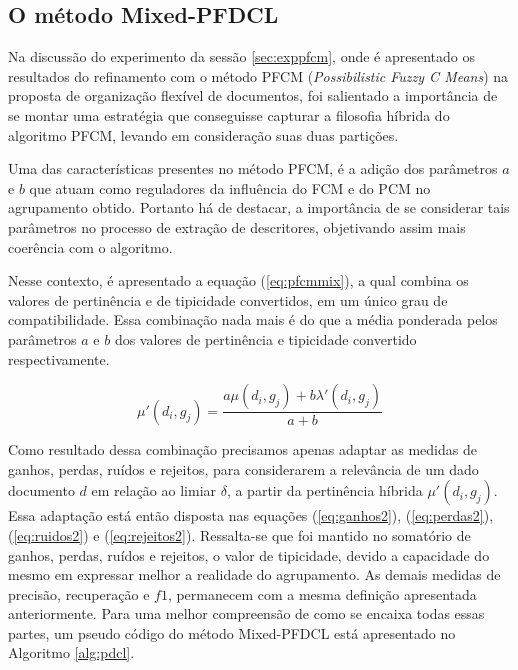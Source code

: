 \subsection{O método Mixed-PFDCL}

Na discussão do experimento da sessão \ref{sec:exppfcm}, onde é apresentado os resultados do
refinamento com o método PFCM ({\it Possibilistic Fuzzy C Means\/}) na proposta de organização
flexível de documentos, foi salientado a importância de se montar uma estratégia que conseguisse
capturar a filosofia híbrida do algoritmo PFCM, levando em consideração suas duas partições. 

Uma das características presentes no método PFCM, é a adição dos parâmetros $a$ e $b$ que atuam como
reguladores da influência do FCM e do PCM no agrupamento obtido. Portanto há de destacar, a
importância de se considerar tais parâmetros no processo de extração de descritores, objetivando
assim mais coerência com o algoritmo.

Nesse contexto, é apresentado a equação (\ref{eq:pfcmmix}), a qual combina os valores de pertinência
e de tipicidade convertidos, em um único grau de compatibilidade. Essa combinação nada mais é do que
a média ponderada pelos parâmetros $a$ e $b$ dos valores de pertinência e tipicidade convertido
respectivamente.

\begin{equation}
  \mu'(d_i,g_j) = \frac{a \mu(d_i,g_j) + b \lambda'(d_i,g_j)}{a+b}
  \label{eq:pfcmmix}
\end{equation}

Como resultado dessa combinação precisamos apenas adaptar as medidas de ganhos, perdas, ruídos e
rejeitos, para considerarem a relevância de um dado documento $d$ em relação ao limiar $\delta$, a
partir da pertinência híbrida $\mu'(d_i,g_j)$. Essa adaptação está então disposta nas equações
(\ref{eq:ganhos2}), (\ref{eq:perdas2}), (\ref{eq:ruidos2}) e (\ref{eq:rejeitos2}). Ressalta-se que
foi mantido no somatório de ganhos, perdas, ruídos e rejeitos, o valor de tipicidade, devido a
capacidade do mesmo em expressar melhor a realidade do agrupamento. As demais medidas de precisão,
recuperação e $f1$, permanecem com a mesma definição apresentada anteriormente. Para uma melhor
compreensão de como se encaixa todas essas partes, um pseudo código do método Mixed-PFDCL está
apresentado no Algoritmo \ref{alg:pdcl}.

